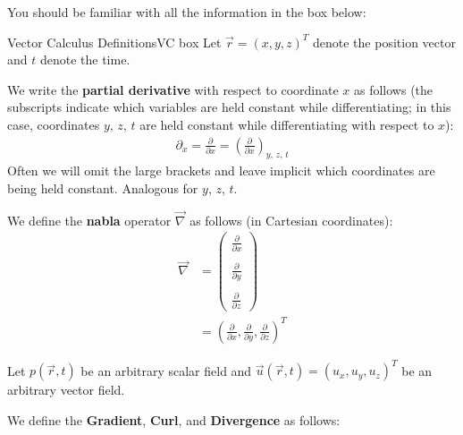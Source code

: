 You should be familiar with all the information in the box below:

\begin{fact}{Vector Calculus Definitions}{VC box}\label{VC box}
    Let $\vec{r}=(x,y,z)^T$ denote the position vector and $t$ denote the time.\vspace{3mm}

    \begin{minipage}{0.49\linewidth}
        We write the \textbf{partial derivative} with respect to coordinate $x$ as follows (the subscripts indicate which variables are held constant while differentiating; in this case, coordinates $y, \, z,\, t$ are held constant while differentiating with respect to $x$):
        \begin{align}\label{partial}
            \partial_{x}=\frac{\partial}{\partial x}=\left( \frac{\partial}{\partial x} \right)_{y,\,z,\,t}
        \end{align}
        Often we will omit the large brackets and leave implicit which coordinates are being held constant. Analogous for $y$, $z$, $t$.
    \end{minipage}
    \hfill
    \begin{minipage}{0.49\linewidth}
        We define the \textbf{nabla} operator $\vec{\nabla}$ as follows (in Cartesian coordinates):
        \begin{align}
            \vec{\nabla}&=\left( \begin{array}{c}
                \frac{\partial}{\partial x}\\\\
                \frac{\partial}{\partial y}\\\\
                \frac{\partial}{\partial z}
            \end{array} \right)
            \\
            &=\left( \frac{\partial}{\partial x}, \frac{\partial}{\partial y}, \frac{\partial}{\partial z} \right)^T \nonumber
        \end{align}
    \end{minipage}

    \vspace{3mm}Let $p(\vec{r},t)$ be an arbitrary scalar field and $\vec{u}(\vec{r},t)=(u_x,u_y,u_z)^T$ be an arbitrary vector field.

    We define the \textbf{Gradient}, \textbf{Curl}, and \textbf{Divergence} as follows:


\end{fact}
